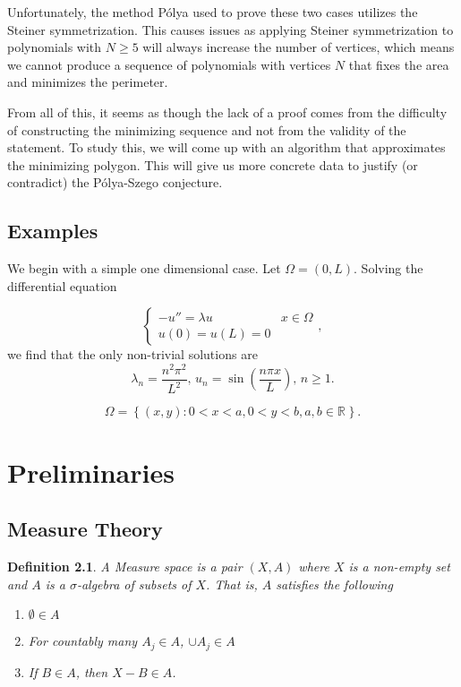 \documentclass[12pt]{report}
\newtheorem{definition}{Definition}
\numberwithin{definition}{section}
\begin{document}
Unfortunately, the method Pólya used to prove these two cases utilizes the Steiner symmetrization.
This causes issues as applying Steiner symmetrization to polynomials with $N \geq 5$ will always increase the number of vertices, which means we cannot produce a sequence of polynomials with vertices $N$ that fixes the area and minimizes the perimeter.

From all of this, it seems as though the lack of a proof comes from the difficulty of constructing the minimizing sequence and not from the validity of the statement.
To study this, we will come up with an algorithm that approximates the minimizing polygon.
This will give us more concrete data to justify (or contradict) the Pólya-Szego conjecture.

\break

\section{Examples}


We begin with a simple one dimensional case.
Let $\Omega = (0,L)$.
Solving the differential equation

\[
  \begin{cases}
    -u'' = \lambda u &  x \in \Omega \\
    u(0) = u(L) = 0 & 
  \end{cases}
,\] 
we find that the only non-trivial solutions are 
\[
  \lambda_{n} = \frac{n^2\pi^2}{L^2},\, u_{n} = \sin \left( \frac{n\pi x}{L} \right ),\, n \geq 1
.\] 


\[
\Omega = \left\{ (x,y) : 0 < x < a, 0 < y < b, a,b \in \mathbb{R}^{}  \right\}
.\] 



\break


\chapter {Preliminaries}

\break


\section{Measure Theory}

\begin{definition}
  A Measure space is a pair $(X,A)$ where $X$ is a non-empty set and $A$ is a $\sigma$-algebra of subsets of $X$.
  That is, $A$ satisfies the following
  \begin{enumerate}
    \item $\emptyset \in A$
    \item For countably many $A_{j} \in A$, $\cup A_{j} \in A$ 
    \item If $B \in A$, then $X - B \in A$.
  \end{enumerate}
\end{definition}
\end{document}
